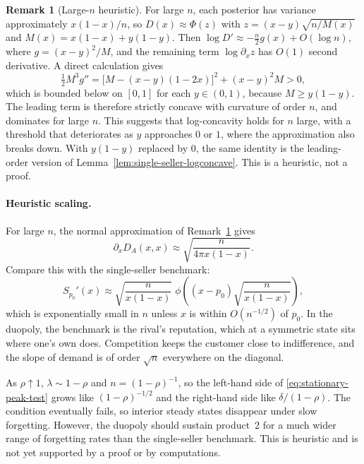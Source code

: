 \documentclass[11pt]{article}
\theoremstyle{definition}
\newtheorem{remark}{Remark}
\begin{document}
\begin{remark}[Large-$n$ heuristic]\label{rem:large-n}
For large $n$, each posterior has variance approximately $x(1-x)/n$, so
$D(x)\approx\Phi(z)$ with $z=(x-y)\sqrt{n/M(x)}$ and
$M(x)=x(1-x)+y(1-y)$. Then $\log D'\approx-\tfrac n2g(x)+O(\log n)$, where
$g=(x-y)^2/M$, and the remaining term $\log\partial_xz$ has $O(1)$ second
derivative. A direct calculation gives
\begin{equation*}
\tfrac12M^3g''=\bigl[M-(x-y)(1-2x)\bigr]^2+(x-y)^2M>0,
\end{equation*}
which is bounded below on $[0,1]$ for each $y\in(0,1)$, because
$M\geq y(1-y)$. The leading term is therefore strictly concave with
curvature of order $n$, and dominates for large $n$. This suggests that
log-concavity holds for $n$ large, with a threshold that deteriorates as $y$
approaches $0$ or $1$, where the approximation also breaks down. With
$y(1-y)$ replaced by $0$, the same identity is the leading-order version of
Lemma~\ref{lem:single-seller-logconcave}. This is a heuristic, not a proof.
\end{remark}

\paragraph{Heuristic scaling.}
For large $n$, the normal approximation of Remark~\ref{rem:large-n} gives
\begin{equation*}
\partial_xD_A(x,x)\approx\sqrt{\frac{n}{4\pi x(1-x)}}.
\end{equation*}
Compare this with the single-seller benchmark:
\begin{equation*}
S_{p_0}'(x)\approx\sqrt{\frac{n}{x(1-x)}}\;
\phi\!\left((x-p_0)\sqrt{\frac{n}{x(1-x)}}\right),
\end{equation*}
which is exponentially small in $n$ unless $x$ is within $O(n^{-1/2})$ of
$p_0$. In the duopoly, the benchmark is the rival's reputation, which at a
symmetric state sits where one's own does. Competition keeps the customer
close to indifference, and the slope of demand is of order $\sqrt n$
everywhere on the diagonal.

As $\rho\uparrow1$, $\lambda\sim1-\rho$ and $n=(1-\rho)^{-1}$, so the
left-hand side of \eqref{eq:stationary-peak-test} grows like $(1-\rho)^{-1/2}$
and the right-hand side like $\delta/(1-\rho)$. The condition eventually
fails, so interior steady states disappear under slow forgetting. However,
the duopoly should sustain product~2 for a much wider range of forgetting
rates than the single-seller benchmark. This is heuristic and is not yet
supported by a proof or by computations.
\end{document}
